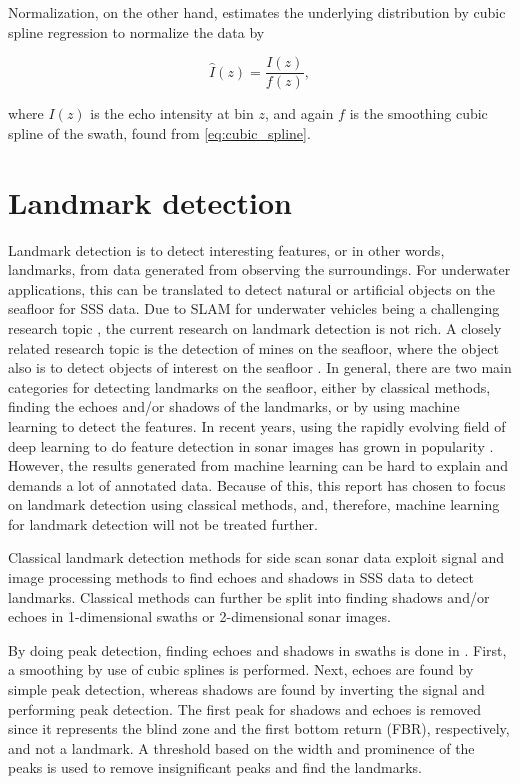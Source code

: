 Normalization, on the other hand, estimates the underlying distribution by cubic spline regression to normalize the data by

\begin{equation}
    \hat{I}(z) = \frac{I(z)}{f(z)},
    \label{eq:swath_norm}
\end{equation}

where $I(z)$ is the echo intensity at bin $z$, and again $f$ is the smoothing cubic spline of the swath, found from \cref{eq:cubic_spline}.

\section{Landmark detection}

Landmark detection is to detect interesting features, or in other words, landmarks, from data generated from observing the surroundings. For underwater applications, this can be translated to detect natural or artificial objects on the seafloor for SSS data. Due to SLAM for underwater vehicles being a challenging research topic \cite{Hidalgo2015ReviewTechniques}, the current research on landmark detection is not rich. A closely related research topic is the detection of mines on the seafloor, where the object also is to detect objects of interest on the seafloor \cite{Picard2016DetectionDimensionality}. In general, there are two main categories for detecting landmarks on the seafloor, either by classical methods, finding the echoes and/or shadows of the landmarks, or by using machine learning to detect the features. In recent years, using the rapidly evolving field of deep learning to do feature detection in sonar images has grown in popularity \cite{Wang2020ImageSonar, Zhou2022NonlinearFeatures}. However, the results generated from machine learning can be hard to explain and demands a lot of annotated data. Because of this, this report has chosen to focus on landmark detection using classical methods, and, therefore, machine learning for landmark detection will not be treated further.

Classical landmark detection methods for side scan sonar data exploit signal and image processing methods to find echoes and shadows in SSS data to detect landmarks. Classical methods can further be split into finding shadows and/or echoes in 1-dimensional swaths or 2-dimensional sonar images.

By doing peak detection, finding echoes and shadows in swaths is done in \cite{Al-Rawi2017LandmarkImages}. First, a smoothing by use of cubic splines is performed. Next, echoes are found by simple peak detection, whereas shadows are found by inverting the signal and performing peak detection. The first peak for shadows and echoes is removed since it represents the blind zone and the first bottom return (FBR), respectively, and not a landmark. A threshold based on the width and prominence of the peaks is used to remove insignificant peaks and find the landmarks.  

